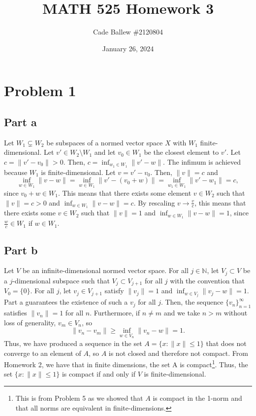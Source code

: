 \documentclass{article}
\title{MATH 525 Homework 3}
\author{Cade Ballew \#2120804}
\date{January 26, 2024}
\begin{document}
	
\maketitle
	
\section{Problem 1}
\subsection{Part a}
Let $W_1\subsetneq W_2$ be subspaces of a normed vector space $X$ with $W_1$ finite-dimensional. Let $v'\in W_2\setminus W_1$ and let $v_0\in W_1$ be the closest element to $v'$. Let $c=\|v'-v_0\|>0$. Then, $c=\inf_{w_1\in W_1}\|v'-w\|$. The infimum is achieved because $W_1$ is finite-dimensional. Let $v=v'-v_0$. Then, $\|v\|=c$ and 
\[
\inf_{w\in W_1}\|v-w\|=\inf_{w\in W_1}\|v'-(v_0+w)\|=\inf_{w_1\in W_1}\|v'-w_1\|=c,
\]
since $v_0+w\in W_1$. This means that there exists some element $v\in W_2$ such that $\|v\|=c>0$ and $\inf_{w\in W_1}\|v-w\|=c$. By rescaling $v\to\frac{v}{c}$, this means that there exists some $v\in W_2$ such that $\|v\|=1$ and 
$\inf_{w\in W_1}\|v-w\|=1$, since $\frac{w}{c}\in W_1$ if $w\in W_1$.

\subsection{Part b}
Let $V$ be an infinite-dimensional normed vector space. For all $j\in\mathbb{N}$, let $V_j\subset V$ be a $j$-dimensional subspace such that $V_j\subset V_{j+1}$ for all $j$ with the convention that $V_0=\{0\}$. For all $j$, let $v_j\in V_{j+1}$ satisfy $\|v_j\|=1$ and $\inf_{w\in V_j}\|v_j-w\|=1$. Part a guarantees the existence of such a $v_j$ for all $j$. Then, the sequence $\{v_n\}_{n=1}^\infty$ satisfies $\|v_n\|=1$ for all $n$. Furthermore, if $n\neq m$ and we take $n>m$ without loss of generality, $v_m\in V_n$, so
\[
\|v_n-v_m\|\geq \inf_{w\in V_n}\|v_n-w\|=1.
\]
Thus, we have produced a sequence in the set $A=\{x:\|x\|\leq1\}$ that does not converge to an element of $A$, so $A$ is not closed and therefore not compact. From Homework 2, we have that in finite dimensions, the set A is compact\footnote{This is from Problem 5 as we showed that $A$ is compact in the 1-norm and that all norms are equivalent in finite-dimensions.}. Thus, the set $\{x:\|x\|\leq1\}$ is compact if and only if $V$ is finite-dimensional.
\end{document}
